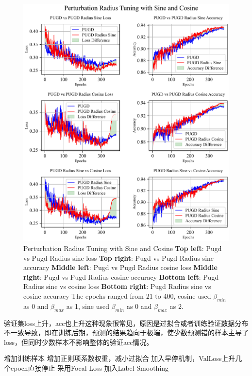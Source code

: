\documentclass[10pt,twocolumn,letterpaper]{article}
\begin{document}
\begin{figure}[htbp]
	\center
	\vspace{-10pt} 
	\includegraphics[width=\columnwidth]{images/PUGDRadius.pdf}
	\caption{Perturbation Radius Tuning with Sine and Cosine
	\textbf{Top left}: Pugd vs Pugd Radius sine loss \textbf{Top right}: Pugd vs Pugd Radius sine accuracy
    \textbf{Middle left}: Pugd vs Pugd Radius cosine loss \textbf{Middle right}: Pugd vs Pugd Radius cosine accuracy
	\textbf{Bottom left}: Pugd Radius sine vs cosine loss \textbf{Bottom right}: Pugd Radius sine vs cosine accuracy
	The epochs ranged from 21 to 400, cosine used $\beta_{min}$ as 0 and $\beta_{max}$ as 1, sine used $\beta_{min}$ as 0 and $\beta_{max}$ as 2.
	}
	\label{fig:PUGDRadius}
\end{figure}

验证集loss上升，acc也上升这种现象很常见，原因是过拟合或者训练验证数据分布不一致导致，即在训练后期，预测的结果趋向于极端，使少数预测错的样本主导了loss，但同时少数样本不影响整体的验证acc情况。

增加训练样本
增加正则项系数权重，减小过拟合
加入早停机制，ValLoss上升几个epoch直接停止
采用Focal Loss
加入Label Smoothing
\end{document}
